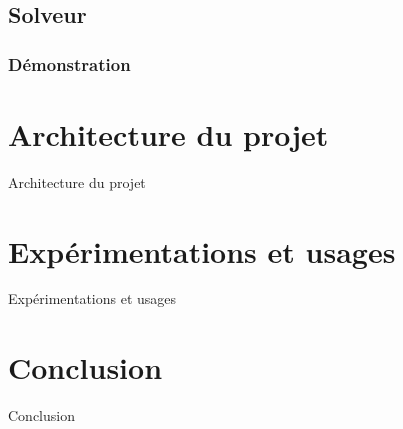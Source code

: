 \documentclass{beamer}
\begin{document}
\subsection{Solveur}
\begin{frame}
\frametitle{Démonstration}
\end{frame}

\section{Architecture du projet}
\begin{frame}
Architecture du projet
\end{frame}
\section{Expérimentations et usages}
\begin{frame}
Expérimentations et usages
\end{frame}
\section{Conclusion}
\begin{frame}
Conclusion
\end{frame}
\end{document}
